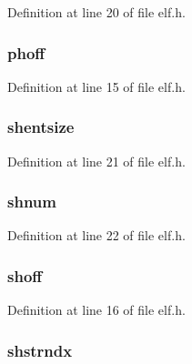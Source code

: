 Definition at line 20 of file elf.\-h.

\hypertarget{structelfhdr_a3b2362e6eca2ec9d08ec047a8bcc13e4}{
\subsubsection[{phoff}]{ phoff}}\label{structelfhdr_a3b2362e6eca2ec9d08ec047a8bcc13e4}


Definition at line 15 of file elf.\-h.

\hypertarget{structelfhdr_af9b275643c2083bb195d46bd28e5160f}{
\subsubsection[{shentsize}]{ shentsize}}\label{structelfhdr_af9b275643c2083bb195d46bd28e5160f}


Definition at line 21 of file elf.\-h.

\hypertarget{structelfhdr_a56c0f0300ab098f73d32e42ad4d7c31e}{
\subsubsection[{shnum}]{ shnum}}\label{structelfhdr_a56c0f0300ab098f73d32e42ad4d7c31e}


Definition at line 22 of file elf.\-h.

\hypertarget{structelfhdr_a1f92826759f4567afd19bfe924be7f2b}{
\subsubsection[{shoff}]{ shoff}}\label{structelfhdr_a1f92826759f4567afd19bfe924be7f2b}


Definition at line 16 of file elf.\-h.

\hypertarget{structelfhdr_a8cab050781091046b4cd1369c5988d48}{
\subsubsection[{shstrndx}]{ shstrndx}}\label{structelfhdr_a8cab050781091046b4cd1369c5988d48}



